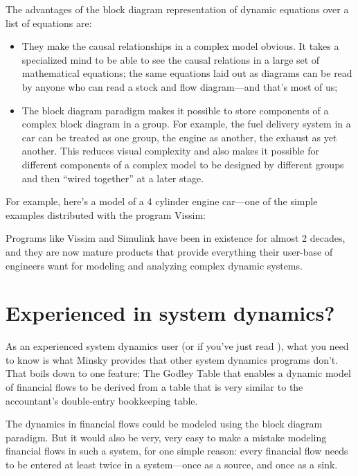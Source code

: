The advantages of the block diagram representation of dynamic equations
over a list of equations are:
\begin{itemize}
\item    They make the causal relationships in a complex model
  obvious. It takes a specialized mind to be able to see the causal
  relations in a large set of mathematical equations; the same
  equations laid out as diagrams can be read by anyone who can read
  a stock and flow diagram---and that's most of us;
\item The block diagram paradigm makes it possible to store components of
  a complex block diagram in a group. For example, the fuel delivery
  system in a car can be treated as one group, the engine as another,
  the exhaust as yet another. This reduces visual complexity and also
  makes it possible for different components of a complex model to be
  designed by different groups and then ``wired together'' at a later
  stage.
\end{itemize}

For example, here's a model of a 4 cylinder engine car---one of the
simple examples distributed with the program Vissim:

\begin{center}
\end{center}

Programs like Vissim and Simulink have been in existence for almost 2
decades, and they are now mature products that provide everything
their user-base of engineers want for modeling and analyzing complex
dynamic systems. 

\section{Experienced in system dynamics?}
\label{intro:experienced}

As an experienced system dynamics user (or if you've just read ), what you need to know is what Minsky
provides that other system dynamics programs don't. That boils down to
one feature: The Godley Table that enables a dynamic model of
financial flows to be derived from a table that is very similar to the
accountant's double-entry bookkeeping table.


The dynamics in financial flows could be modeled using the block diagram
paradigm. But it would also be very, very easy to make a mistake
modeling financial flows in such a system, for one simple reason:
every financial flow needs to be entered at least twice in a
system---once as a source, and once as a sink.



